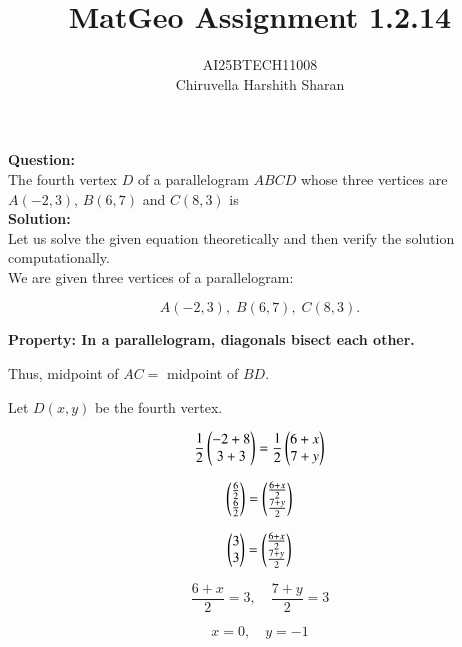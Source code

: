 \documentclass[journal]{IEEEtran}
\begin{document}

\vspace{3cm}

\title{MatGeo Assignment 1.2.14}
\author{AI25BTECH11008\\Chiruvella Harshith Sharan}

 \maketitle
{\let\newpage\relax\maketitle}

\renewcommand{\thefigure}{\theenumi}
\renewcommand{\thetable}{\theenumi}
\setlength{\intextsep}{10pt} %


\renewcommand{\thetable}{\theenumi}
\noindent
\textbf{Question:}\\
The fourth vertex $D$ of a parallelogram $ABCD$ whose three vertices are 
$A(-2,3)$, $B(6,7)$ and $C(8,3)$ is \\
\noindent
\textbf{Solution:}\\
Let us solve the given equation theoretically and then verify the solution computationally. \\

We are given three vertices of a parallelogram:

\[
A(-2,3), \; B(6,7), \; C(8,3).
\]

\textbf{Property: In a parallelogram, diagonals bisect each other.}

Thus, midpoint of $AC = $ midpoint of $BD$.  

Let $D(x,y)$ be the fourth vertex.  

\[
\frac{1}{2}
\begin{pmatrix}
-2+8 \\
3+3
\end{pmatrix}
=
\frac{1}{2}
\begin{pmatrix}
6+x \\
7+y
\end{pmatrix}
\]

\[
\begin{pmatrix}
\frac{6}{2} \\
\frac{6}{2}
\end{pmatrix}
=
\begin{pmatrix}
\frac{6+x}{2} \\
\frac{7+y}{2}
\end{pmatrix}
\]

\[
\begin{pmatrix}
3 \\
3
\end{pmatrix}
=
\begin{pmatrix}
\frac{6+x}{2} \\
\frac{7+y}{2}
\end{pmatrix}
\]

\[
\frac{6+x}{2} = 3, \quad \frac{7+y}{2} = 3
\]

\[
x = 0, \quad y = -1
\]
\end{document}
